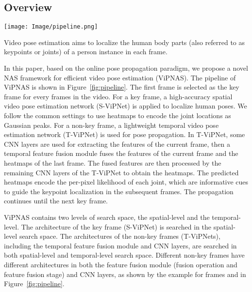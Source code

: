 \documentclass[final]{cvpr}
\begin{document}
\subsection{Overview}
\begin{figure*}[t]
	\centering
	\texttt{[image: Image/pipeline.png]}
	\caption{ViPNAS consists of one image-based key frame pose model S-ViPNet, and  video-based pose model T-ViPNets containing temporal feature module and various CNN architectures. Videos are processed frame-by-frame in an online mode. S-ViPNet first predicts the pose heatmaps  of the key frame , and propagates them to the next frame . T-ViPNet selects the CNN architecture, as well as the input features (\eg  to ) and fusion operation (\eg Add, Cat and Mul) of fusion module. The fusion module combines the selected feature  with the propagated heatmaps , and generates the fused features  for predicting the heatmaps .}
	\label{fig:pipeline}
\end{figure*}


Video pose estimation aims to localize the human body parts (also referred to as keypoints or joints) of a person instance in each frame. 

In this paper, based on the online pose propagation paradigm, we propose a novel NAS framework for efficient video pose estimation (ViPNAS). The pipeline of ViPNAS is shown in Figure~\ref{fig:pipeline}. The first frame is selected as the key frame for every  frames in the video. For a key frame, a high-accuracy spatial video pose estimation network (S-ViPNet) is applied to localize human poses. We follow the common settings to use heatmaps to encode the joint locations as Gaussian peaks. For a non-key frame, a lightweight temporal video pose estimation network (T-ViPNet) is used for pose propagation. In T-ViPNet, some CNN layers are used for extracting the features of the current frame, then a temporal feature fusion module fuses the features of the current frame and the heatmaps of the last frame. The fused features are then processed by the remaining CNN layers of the T-ViPNet to obtain the heatmaps.  The predicted heatmaps encode the per-pixel likelihood of each joint, which are informative cues to guide the keypoint localization in the subsequent frames. The propagation continues until the next key frame. 

ViPNAS contains two levels of search space, \ie the spatial-level and the temporal-level. The architecture of the key frame (S-ViPNet) is searched in the spatial-level search space. The architectures of the non-key frames (T-ViPNets), including the temporal feature fusion module and CNN layers, are searched in both spatial-level and temporal-level search space. Different non-key frames have different architectures in both the feature fusion module (fusion operation and feature fusion stage) and CNN layers, as shown by the example for frames  and  in Figure~\ref{fig:pipeline}.
\end{document}
